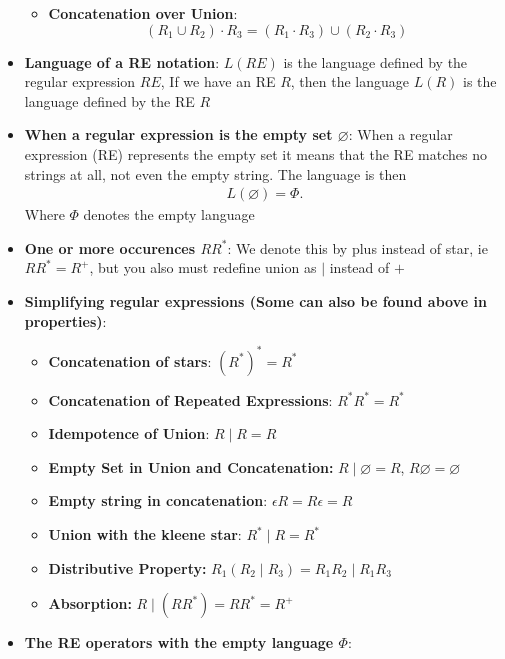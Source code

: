 \documentclass{report}
\begin{document}
\begin{itemize}
\begin{itemize}
            \item \textbf{Concatenation over Union}:
                \[
                    (R_1 \cup R_2) \cdot R_3 = (R_1 \cdot R_3) \cup (R_2 \cdot R_3)
                \]
        \end{itemize}
    \item \textbf{Language of a RE notation}: $L(RE)$ is the language defined by the regular expression $RE$, If we have an RE $R$, then the language $L(R)$ is the language defined by the RE $R$
    \item \textbf{When a regular expression is the empty set $\varnothing$}: When a regular expression (RE) represents the empty set it means that the RE matches no strings at all, not even the empty string.
        \bigbreak \noindent 
        The language is then
        \begin{align*}
            L(\varnothing) = \Phi        
        .\end{align*}
        Where $\Phi$ denotes the empty language
    \item \textbf{One or more occurences $RR^{*}$}: We denote this by plus instead of star, ie $RR^{*} = R^{+}$, but you also must redefine union as $\mid$ instead of $+$
    \item \textbf{Simplifying regular expressions (Some can also be found above in properties)}:
        \begin{itemize}
            \item \textbf{Concatenation of stars}: $(R^{*})^{*}  = R^{*}$
            \item \textbf{Concatenation of Repeated Expressions}: $R^{*}R^{*} = R^{*} $
            \item \textbf{Idempotence of Union}: $R\mid R = R$
            \item \textbf{Empty Set in Union and Concatenation:} $R \mid \varnothing  = R$, $R\varnothing = \varnothing $
            \item \textbf{Empty string in concatenation}: $\epsilon R = R\epsilon = R $
            \item \textbf{Union with the kleene star}: $R^{*}\mid R = R^{*}$
            \item \textbf{Distributive Property:} $R_{1}(R_{2} \mid R_{3}) = R_{1}R_{2} \mid R_{1}R_{3} $
            \item \textbf{Absorption:} $R\mid (RR^{*})  = RR^{*} = R^{+}$
        \end{itemize}
    \item \textbf{The RE operators with the empty language $\Phi$}:

\end{itemize}
\end{document}
